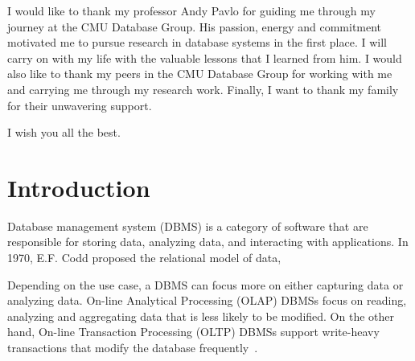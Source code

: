 \documentclass[12pt]{cmuthesis}
\begin{document}
\begin{acknowledgments}
I would like to thank my professor Andy Pavlo for guiding me through my journey at the CMU Database Group. His passion, energy and commitment motivated me to pursue research in database systems in the first place. I will carry on with my life with the valuable lessons that I learned from him. I would also like to thank my peers in the CMU Database Group for working with me and carrying me through my research work. Finally, I want to thank my family for their unwavering support.
\newline

I wish you all the best.
\end{acknowledgments}



\tableofcontents
\listoffigures
\listoftables

\mainmatter


%
%
%
%
%


\chapter{Introduction}
Database management system (DBMS) is a category of software that are responsible for storing data, analyzing data, and interacting with applications. In 1970, E.F. Codd proposed the relational model of data, 

Depending on the use case, a DBMS can focus more on either capturing data or analyzing data. On-line Analytical Processing (OLAP) DBMSs focus on reading, analyzing and aggregating data that is less likely to be modified. On the other hand, On-line Transaction Processing (OLTP) DBMSs support write-heavy transactions that modify the database frequently~\cite{conn05}.
\end{document}
